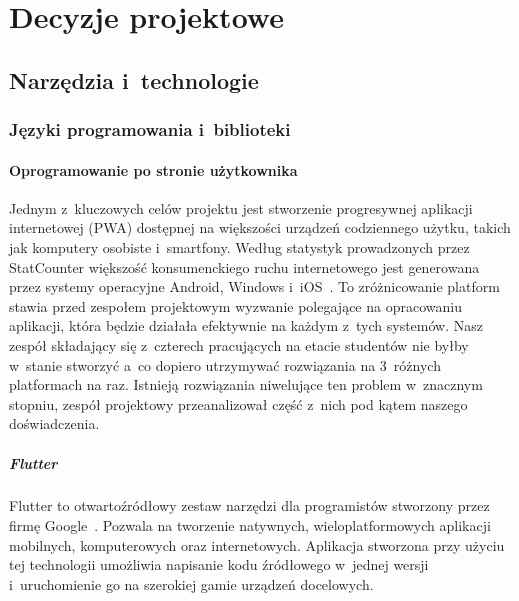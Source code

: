 
\chapter{Decyzje projektowe}
\label{ch:decyzje-projektowe}

\section{Narzędzia i~technologie}
\label{sec:narzedzia-i-technologie}

\subsection{Języki programowania i~biblioteki}
\label{subsec:jezyki-programowania-i-biblioteki}

\subsubsection{Oprogramowanie po stronie użytkownika}
Jednym z~kluczowych celów projektu jest stworzenie progresywnej aplikacji internetowej (PWA) dostępnej na większości urządzeń codziennego użytku, takich jak komputery osobiste i~smartfony.
Według statystyk prowadzonych przez StatCounter większość konsumenckiego ruchu internetowego jest generowana przez systemy operacyjne Android, Windows i~iOS~\cite{statcounter-os-shares}\@.
To zróżnicowanie platform stawia przed zespołem projektowym wyzwanie polegające na opracowaniu aplikacji, która będzie działała efektywnie na każdym z~tych systemów.
Nasz zespół składający się z~czterech pracujących na etacie studentów nie byłby w~stanie stworzyć a~co dopiero utrzymywać rozwiązania na 3~różnych platformach na raz.
Istnieją rozwiązania niwelujące ten problem w~znacznym stopniu, zespół projektowy przeanalizował część z~nich pod kątem naszego doświadczenia.

\paragraph{Flutter}
Flutter to otwartoźródłowy zestaw narzędzi dla programistów stworzony przez firmę Google~\cite{flutter-quick-start}.
Pozwala na tworzenie natywnych, wieloplatformowych aplikacji mobilnych, komputerowych oraz internetowych.
Aplikacja stworzona przy użyciu tej technologii umożliwia napisanie kodu źródłowego w~jednej wersji i~uruchomienie go na szerokiej gamie urządzeń docelowych.

